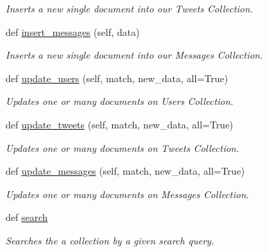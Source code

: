 \begin{DoxyCompactItemize}
\begin{DoxyCompactList}\small\item\em Inserts a new single document into our Tweets Collection. \end{DoxyCompactList}\item 
def \hyperlink{classtwitter_1_1wrappers_1_1mongo__wrapper_1_1MongoAPI_af601222e36a6c0b6e131f788388ef992}{insert\+\_\+messages} (self, data)
\begin{DoxyCompactList}\small\item\em Inserts a new single document into our Messages Collection. \end{DoxyCompactList}\item 
def \hyperlink{classtwitter_1_1wrappers_1_1mongo__wrapper_1_1MongoAPI_aa4b9a6fb625844e6b78072b8818affd7}{update\+\_\+users} (self, match, new\+\_\+data, all=True)
\begin{DoxyCompactList}\small\item\em Updates one or many documents on Users Collection. \end{DoxyCompactList}\item 
def \hyperlink{classtwitter_1_1wrappers_1_1mongo__wrapper_1_1MongoAPI_a2b622e0eb9a3f45ecdf4b5f620f0231e}{update\+\_\+tweets} (self, match, new\+\_\+data, all=True)
\begin{DoxyCompactList}\small\item\em Updates one or many documents on Tweets Collection. \end{DoxyCompactList}\item 
def \hyperlink{classtwitter_1_1wrappers_1_1mongo__wrapper_1_1MongoAPI_a731dfdca8eac58b3b2b052e0a28bffcd}{update\+\_\+messages} (self, match, new\+\_\+data, all=True)
\begin{DoxyCompactList}\small\item\em Updates one or many documents on Messages Collection. \end{DoxyCompactList}\item 
def \hyperlink{classtwitter_1_1wrappers_1_1mongo__wrapper_1_1MongoAPI_aba0464a1d64aee45155401dd766d0d7e}{search}
\begin{DoxyCompactList}\small\item\em Searches the a collection by a given search query. \end{DoxyCompactList}\end{DoxyCompactItemize}
